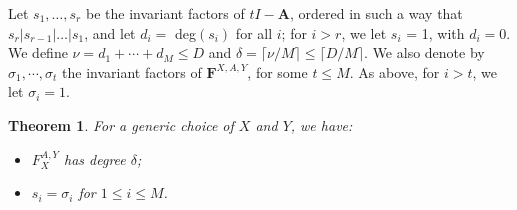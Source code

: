 \documentclass[12pt]{article}
\newtheorem{theorem}[definition]{Theorem}
\def\mA{\mathbf{A}}
\def\mF{\mathbf{F}}
\begin{document}
Let $s_1, \dots, s_r$ be the invariant factors
of $tI - \mA$, ordered in such a way that 
$s_r | s_{r-1}| \dots | s_1$, and let $d_i = $ deg$(s_i)$ for
all $i$; for $i > r$, we let $s_i$ = 1, with $d_i = 0$.
We define $\nu = d_1 + \cdots + d_M \le D$ and
$\delta = \lceil \nu / M \rceil \le \lceil D / M \rceil$.
We also denote by $\sigma_1, \cdots, \sigma_t$ the invariant
factors of $\mF^{X,A,Y}$, for some $t \le M$. As above,
for $i > t$, we let $\sigma_i = 1$.

\begin{theorem}
	\label{randXY}
	For a generic choice of $X$ and $Y$, we have:
	\begin{itemize}
		\item $F_X^{A,Y}$ has degree $\delta$;
		\item $s_i = \sigma_i$ for $1 \le i \le M$.
	\end{itemize}
\end{theorem}
\end{document}
